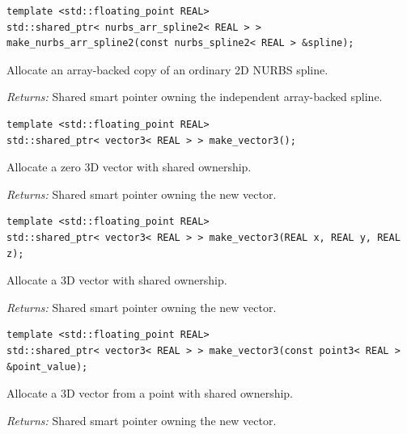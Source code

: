 \par\noindent\begin{minipage}{\linewidth}
\begin{lstlisting}[style=apireference]
template <std::floating_point REAL>
std::shared_ptr< nurbs_arr_spline2< REAL > > make_nurbs_arr_spline2(const nurbs_spline2< REAL > &spline);
\end{lstlisting}
{\footnotesize Allocate an array-backed copy of an ordinary 2D NURBS spline.\par}
{\footnotesize\textit{Returns:} Shared smart pointer owning the independent array-backed spline.\par}
\end{minipage}\par\vspace{1pt}
\par\noindent\begin{minipage}{\linewidth}
\begin{lstlisting}[style=apireference]
template <std::floating_point REAL>
std::shared_ptr< vector3< REAL > > make_vector3();
\end{lstlisting}
{\footnotesize Allocate a zero 3D vector with shared ownership.\par}
{\footnotesize\textit{Returns:} Shared smart pointer owning the new vector.\par}
\end{minipage}\par\vspace{1pt}
\par\noindent\begin{minipage}{\linewidth}
\begin{lstlisting}[style=apireference]
template <std::floating_point REAL>
std::shared_ptr< vector3< REAL > > make_vector3(REAL x, REAL y, REAL z);
\end{lstlisting}
{\footnotesize Allocate a 3D vector with shared ownership.\par}
{\footnotesize\textit{Returns:} Shared smart pointer owning the new vector.\par}
\end{minipage}\par\vspace{1pt}
\par\noindent\begin{minipage}{\linewidth}
\begin{lstlisting}[style=apireference]
template <std::floating_point REAL>
std::shared_ptr< vector3< REAL > > make_vector3(const point3< REAL > &point_value);
\end{lstlisting}
{\footnotesize Allocate a 3D vector from a point with shared ownership.\par}
{\footnotesize\textit{Returns:} Shared smart pointer owning the new vector.\par}
\end{minipage}\par\vspace{1pt}
